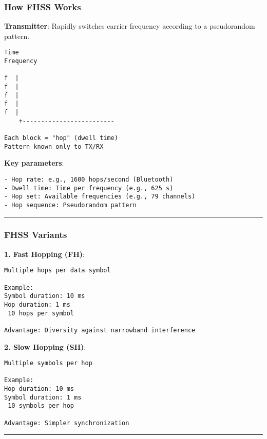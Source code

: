 \subsubsection{How FHSS Works}\label{how-fhss-works}

\textbf{Transmitter}: Rapidly switches carrier frequency according to a
pseudorandom pattern.

\begin{verbatim}
Time 
Frequency
    
f  |                
f  |            
f  |                   
f  |               
f  |                      
    +-------------------------

Each block = "hop" (dwell time)
Pattern known only to TX/RX
\end{verbatim}

\textbf{Key parameters}:

\begin{verbatim}
- Hop rate: e.g., 1600 hops/second (Bluetooth)
- Dwell time: Time per frequency (e.g., 625 s)
- Hop set: Available frequencies (e.g., 79 channels)
- Hop sequence: Pseudorandom pattern
\end{verbatim}

\begin{center}\rule{0.5\linewidth}{0.5pt}\end{center}

\subsubsection{FHSS Variants}\label{fhss-variants}

\textbf{1. Fast Hopping (FH)}:

\begin{verbatim}
Multiple hops per data symbol

Example:
Symbol duration: 10 ms
Hop duration: 1 ms
 10 hops per symbol

Advantage: Diversity against narrowband interference
\end{verbatim}

\textbf{2. Slow Hopping (SH)}:

\begin{verbatim}
Multiple symbols per hop

Example:
Hop duration: 10 ms
Symbol duration: 1 ms
 10 symbols per hop

Advantage: Simpler synchronization
\end{verbatim}

\begin{center}\rule{0.5\linewidth}{0.5pt}\end{center}

